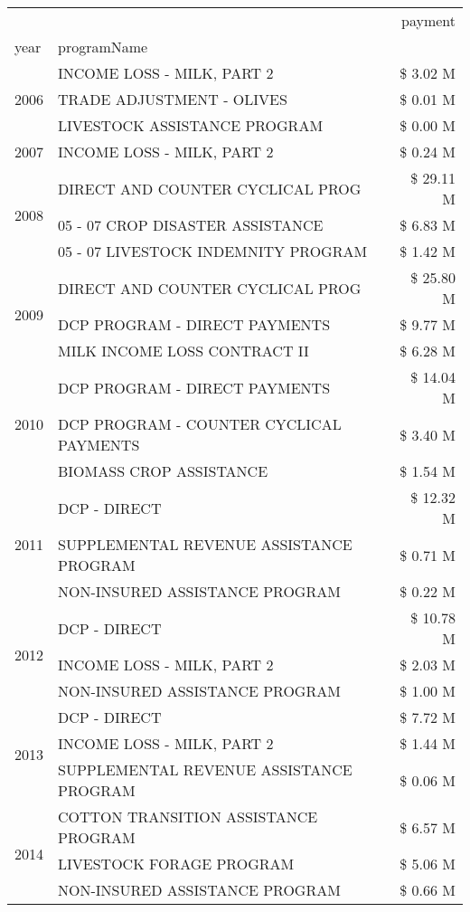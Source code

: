 \begin{tabular}{llr}
\toprule
 &  & payment \\
year & programName &  \\
\midrule
\multirow[t]{3}{*}{2006} & INCOME LOSS - MILK, PART 2 & \$ 3.02 M \\
 & TRADE ADJUSTMENT - OLIVES & \$ 0.01 M \\
 & LIVESTOCK ASSISTANCE PROGRAM & \$ 0.00 M \\
\cline{1-3}
2007 & INCOME LOSS - MILK, PART 2 & \$ 0.24 M \\
\cline{1-3}
\multirow[t]{3}{*}{2008} & DIRECT AND COUNTER CYCLICAL PROG & \$ 29.11 M \\
 & 05 - 07 CROP DISASTER ASSISTANCE & \$ 6.83 M \\
 & 05 - 07 LIVESTOCK INDEMNITY PROGRAM & \$ 1.42 M \\
\cline{1-3}
\multirow[t]{3}{*}{2009} & DIRECT AND COUNTER CYCLICAL PROG & \$ 25.80 M \\
 & DCP PROGRAM - DIRECT PAYMENTS & \$ 9.77 M \\
 & MILK INCOME LOSS CONTRACT II & \$ 6.28 M \\
\cline{1-3}
\multirow[t]{3}{*}{2010} & DCP PROGRAM - DIRECT PAYMENTS & \$ 14.04 M \\
 & DCP PROGRAM - COUNTER CYCLICAL PAYMENTS & \$ 3.40 M \\
 & BIOMASS CROP ASSISTANCE & \$ 1.54 M \\
\cline{1-3}
\multirow[t]{3}{*}{2011} & DCP - DIRECT & \$ 12.32 M \\
 & SUPPLEMENTAL REVENUE ASSISTANCE PROGRAM & \$ 0.71 M \\
 & NON-INSURED ASSISTANCE PROGRAM & \$ 0.22 M \\
\cline{1-3}
\multirow[t]{3}{*}{2012} & DCP - DIRECT & \$ 10.78 M \\
 & INCOME LOSS - MILK, PART 2 & \$ 2.03 M \\
 & NON-INSURED ASSISTANCE PROGRAM & \$ 1.00 M \\
\cline{1-3}
\multirow[t]{3}{*}{2013} & DCP - DIRECT & \$ 7.72 M \\
 & INCOME LOSS - MILK, PART 2 & \$ 1.44 M \\
 & SUPPLEMENTAL REVENUE ASSISTANCE PROGRAM & \$ 0.06 M \\
\cline{1-3}
\multirow[t]{3}{*}{2014} & COTTON TRANSITION ASSISTANCE PROGRAM & \$ 6.57 M \\
 & LIVESTOCK FORAGE PROGRAM & \$ 5.06 M \\
 & NON-INSURED ASSISTANCE PROGRAM & \$ 0.66 M \\

\end{tabular}
